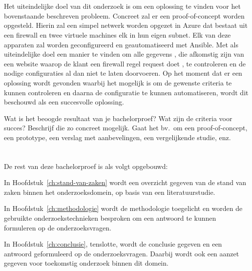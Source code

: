 \section{}%
\label{sec:onderzoeksdoelstelling}
Het uiteindelijke doel van dit onderzoek is om een oplossing te vinden voor het bovenstaande beschreven probleem. Concreet zal er een proof-of-concept worden opgesteld. Hierin zal een simpel netwerk worden opgezet in Azure dat bestaat uit een firewall en twee virtuele machines elk in hun eigen subnet. Elk van deze apparaten zal worden geconfigureerd en geautomatiseerd met Ansible. Met als uiteindelijke doel een manier te vinden om alle gegevens , die afkomstig zijn van een website waarop de klant een firewall regel request doet , te controleren en de nodige configuraties al dan niet te laten doorvoeren. Op het moment dat er een oplossing wordt gevonden waarbij het mogelijk is om de gewenste criteria te kunnen controleren en daarna de configuratie te kunnen automatiseren, wordt dit beschouwd als een succesvolle oplossing. 

Wat is het beoogde resultaat van je bachelorproef? Wat zijn de criteria voor succes? Beschrijf die zo concreet mogelijk. Gaat het bv.\ om een proof-of-concept, een prototype, een verslag met aanbevelingen, een vergelijkende studie, enz.

\section{}%
\label{sec:opzet-bachelorproef-TODO}


De rest van deze bachelorproef is als volgt opgebouwd:

In Hoofdstuk~\ref{ch:stand-van-zaken} wordt een overzicht gegeven van de stand van zaken binnen het onderzoeksdomein, op basis van een literatuurstudie.

In Hoofdstuk~\ref{ch:methodologie} wordt de methodologie toegelicht en worden de gebruikte onderzoekstechnieken besproken om een antwoord te kunnen formuleren op de onderzoeksvragen.


In Hoofdstuk~\ref{ch:conclusie}, tenslotte, wordt de conclusie gegeven en een antwoord geformuleerd op de onderzoeksvragen. Daarbij wordt ook een aanzet gegeven voor toekomstig onderzoek binnen dit domein.